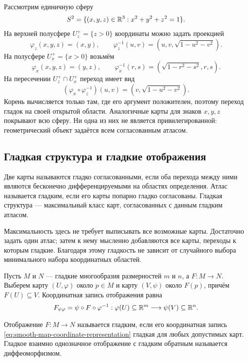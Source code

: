 Рассмотрим единичную сферу
\[
S^2=\{(x,y,z)\in\mathbb{R}^3:x^2+y^2+z^2=1\}.
\]
На верхней полусфере \(U_z^+=\{z>0\}\) координаты можно задать проекцией
\[
\varphi_z(x,y,z)=(x,y),
\qquad
\varphi_z^{-1}(u,v)
=\left(u,v,\sqrt{1-u^2-v^2}\right).
\]
На полусфере \(U_x^+=\{x>0\}\) возьмём
\[
\varphi_x(x,y,z)=(y,z),
\qquad
\varphi_x^{-1}(r,s)
=\left(\sqrt{1-r^2-s^2},r,s\right).
\]
На пересечении \(U_z^+\cap U_x^+\) переход имеет вид
\begin{equation}
\label{eq:sphere-chart-transition}
(\varphi_x\circ\varphi_z^{-1})(u,v)
=
\left(v,\sqrt{1-u^2-v^2}\right).
\end{equation}
Корень вычисляется только там, где его аргумент положителен, поэтому переход гладок на своей открытой области. Аналогичные карты для знаков \(x,y,z\) покрывают всю сферу. Ни одна из них не является привилегированной: геометрический объект задаётся всем согласованным атласом.

\subsection{Гладкая структура и гладкие отображения}

\begin{definition}
Две карты называются гладко согласованными, если оба перехода между ними являются бесконечно дифференцируемыми на областях определения. Атлас называется гладким, если его карты попарно гладко согласованы. Гладкая структура --- максимальный класс карт, согласованных с данным гладким атласом.
\end{definition}

Максимальность здесь не требует выписывать все возможные карты. Достаточно задать один атлас; затем к нему мысленно добавляются все карты, переходы к которым гладкие. Благодаря этому гладкость не зависит от случайного выбора минимального набора координатных областей.

Пусть \(M\) и \(N\) --- гладкие многообразия размерностей \(m\) и \(n\), а \(F:M\to N\). Выберем карту \((U,\varphi)\) около \(p\in M\) и карту \((V,\psi)\) около \(F(p)\), причём \(F(U)\subseteq V\). Координатная запись отображения равна
\begin{equation}
\label{eq:smooth-map-coordinate-representation}
F_{\psi\varphi}
=
\psi\circ F\circ\varphi^{-1}:
\varphi(U)\subseteq\mathbb{R}^m
\longrightarrow
\psi(V)\subseteq\mathbb{R}^n.
\end{equation}

\begin{definition}
Отображение \(F:M\to N\) называется гладким, если его координатная запись \eqref{eq:smooth-map-coordinate-representation} гладкая для любых допустимых карт. Гладкое взаимно однозначное отображение с гладким обратным называется диффеоморфизмом.
\end{definition}

